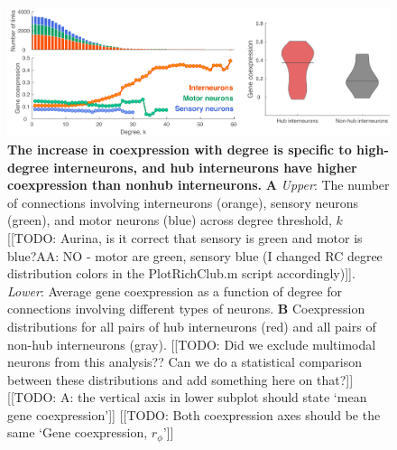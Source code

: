\documentclass[10pt,letterpaper]{article}
\begin{document}
\begin{figure}[h]
\centering
   \includegraphics[width=1\textwidth]{TypeDegree.pdf}
 \caption{
\textbf{The increase in coexpression with degree is specific to high-degree interneurons, and hub interneurons have higher coexpression than nonhub interneurons.}
\textbf{A} \emph{Upper}: The number of connections involving interneurons (orange), sensory neurons (green), and motor neurons (blue) across degree threshold, $k$ [[TODO: Aurina, is it correct that sensory is green and motor is blue?AA: NO - motor are green, sensory blue (I changed RC degree distribution colors in the PlotRichClub.m script accordingly)]].
\emph{Lower}: Average gene coexpression as a function of degree for connections involving different types of neurons.
\textbf{B} Coexpression distributions for all pairs of hub interneurons (red) and all pairs of non-hub interneurons (gray).
[[TODO: Did we exclude multimodal neurons from this analysis?? Can we do a statistical comparison between these distributions and add something here on that?]]
[[TODO: A: the vertical axis in lower subplot should state `mean gene coexpression']]
[[TODO: Both coexpression axes should be the same `Gene coexpression, $r_\phi$']]
 \label{fig:interneuron_dep}
}
\end{figure}
\end{document}
